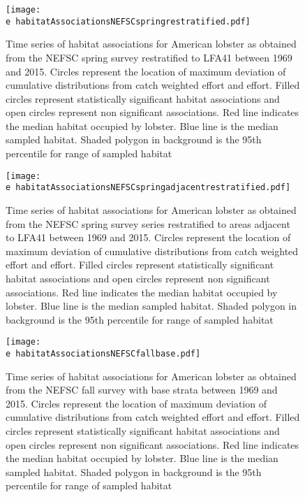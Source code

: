 \documentclass[11pt]{article}
\newcommand{\e}{/backup/bio_data/bio.lobster/figures/} %
\begin{document}
\begin{figure}

    \texttt{[image: \\e habitatAssociationsNEFSCspringrestratified.pdf]}
    \caption{Time series of habitat associations for American lobster as obtained from the NEFSC spring survey restratified to LFA41 between 1969 and 2015. Circles represent the location of maximum deviation of cumulative distributions from catch weighted effort and effort. Filled circles represent statistically significant habitat associations and open circles represent non significant associations. Red line indicates the median habitat occupied by lobster. Blue line is the median sampled habitat. Shaded polygon in background is the 95th percentile for range of sampled habitat}

\end{figure}



\begin{figure}

    \texttt{[image: \\e habitatAssociationsNEFSCspringadjacentrestratified.pdf]}
    \caption{Time series of habitat associations for American lobster as obtained from the NEFSC spring survey series restratified to areas adjacent to LFA41 between 1969 and 2015. Circles represent the location of maximum deviation of cumulative distributions from catch weighted effort and effort. Filled circles represent statistically significant habitat associations and open circles represent non significant associations. Red line indicates
the median habitat occupied by lobster. Blue line is the median sampled habitat. Shaded polygon in background is the 95th percentile for range of sampled habitat}

\end{figure}




\begin{figure}

    \texttt{[image: \\e habitatAssociationsNEFSCfallbase.pdf]}
    \caption{Time series of habitat associations for American lobster as obtained from the NEFSC fall survey with base strata between 1969 and 2015. Circles represent the location of maximum deviation of cumulative distributions from catch weighted effort and effort. Filled circles represent statistically significant habitat associations and open circles represent non significant associations. Red line indicates
the median habitat occupied by lobster. Blue line is the median sampled habitat. Shaded polygon in background is the 95th percentile for range of sampled habitat}

\end{figure}
\end{document}
